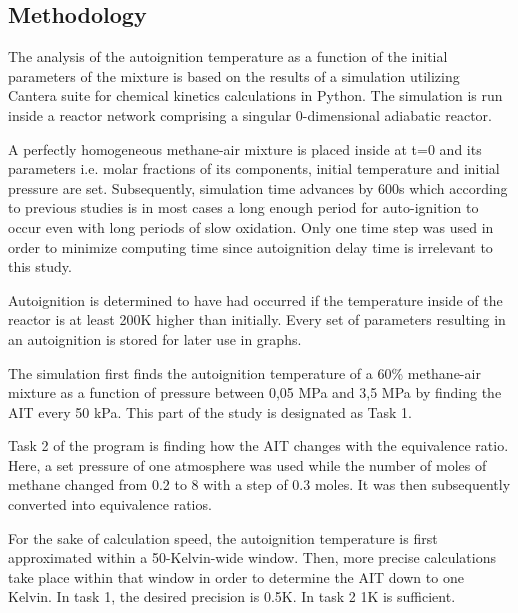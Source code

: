 \documentclass[a4paper]{article}[11pt]
\begin{document}
    \subsection{Methodology}
    	The analysis of the autoignition temperature as a function of the initial parameters of the mixture is based on the results of a simulation utilizing Cantera suite for chemical kinetics calculations in Python. The simulation is run inside a reactor network comprising a singular 0-dimensional adiabatic reactor. \par 
        A perfectly homogeneous methane-air mixture is placed inside at t=0 and its parameters i.e. molar fractions of its components, initial temperature and initial pressure are set. Subsequently, simulation time advances by 600s which according to previous studies is in most cases a long enough period for auto-ignition to occur even with long periods of slow oxidation. Only one time step was used in order to minimize computing time since autoignition delay time is irrelevant to this study. \par 
        Autoignition is determined to have had occurred if the temperature inside of the reactor is at least 200K higher than initially. Every set of parameters resulting in an autoignition is stored for later use in graphs. \par
        The simulation first finds the autoignition temperature of a 60\% methane-air mixture as a function of pressure between 0,05 MPa and 3,5 MPa by finding the AIT every 50 kPa. This part of the study is designated as Task 1. \par
        Task 2 of the program is finding how the AIT changes with the equivalence ratio. Here, a set pressure of one atmosphere was used while the number of moles of methane changed from 0.2 to 8 with a step of 0.3 moles. It was then subsequently converted into equivalence ratios.  \par 
        For the sake of calculation speed, the autoignition temperature is first approximated within a 50-Kelvin-wide window. Then, more precise calculations take place within that window in order to determine the AIT down to one Kelvin. In task 1, the desired precision is 0.5K. In task 2 1K is sufficient.
    
\end{document}
